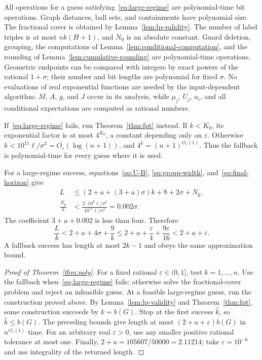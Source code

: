 \documentclass[11pt]{article}
\numberwithin{equation}{section}
\theoremstyle{definition}
\begin{document}
All operations for a guess satisfying~\eqref{eq:large-regime} are
polynomial-time bit operations. Graph distances, ball sets, and
containments have polynomial size. The fractional cover is obtained by
Lemma~\ref{lem:lp-validity}. The number of label triples is at most
$nk(H+1)$, and $N_0$ is an absolute constant.
Guard deletion, grouping, the computations of
Lemma~\ref{lem:conditional-computation}, and the rounding of
Lemma~\ref{lem:cumulative-rounding} are polynomial-time operations.
Geometric endpoints can be compared with integers by exact powers of
the rational $1+\sigma$; their number and bit lengths are polynomial
for fixed $\sigma$. No evaluations of real exponential functions are
needed by the input-dependent algorithm: $M$, $A$, $g$, and $J$ occur
in its analysis, while $\mu_j$, $U_j$, $a_i$, and all conditional
expectations are computed as rational numbers.

If~\eqref{eq:large-regime} fails, run Theorem~\ref{thm:fpt} instead.
If $k<K_0$, its exponential factor is at most $4^{K_0}$, a constant
depending only on $\varepsilon$. Otherwise
$k<10^{11}\ell/\sigma^3=O_\varepsilon(\log(n+1))$, and
$4^k=(n+1)^{O_\varepsilon(1)}$. Thus the fallback is polynomial-time
for every guess where it is used.

For a large-regime success, equations~\eqref{eq:U-B},
\eqref{eq:group-width}, and~\eqref{eq:final-horizon} give
\begin{align}
 L&\le(2+a+(3+a)\sigma)k+8+2\sigma+N_{\mathrm g},
       \label{eq:length-overhead}\\
 \frac{N_{\mathrm g}}k
 &<\frac{2\cdot10^8\ell/\sigma^2}
          {10^{11}\ell/\sigma^3}
   =0.002\sigma. \label{eq:guard-ratio}
\end{align}
The coefficient $3+a+0.002$ is less than four. Therefore
\[
 \frac Lk<2+a+4\sigma+\frac9k
       \le2+a+\frac{\varepsilon}{4}+\frac{9\varepsilon}{16}
       <2+a+\varepsilon.
\]
A fallback success has length at most $2k-1$ and obeys the same
approximation bound.

\begin{proof}[Proof of Theorem~\ref{thm:poly}]
For a fixed rational $\varepsilon\in(0,1]$, test $k=1,\ldots,n$.
Use the fallback when~\eqref{eq:large-regime} fails; otherwise solve
the fractional-cover problem and reject an infeasible guess. At a
feasible large-regime guess, run the construction proved above.
By Lemma~\ref{lem:lp-validity} and Theorem~\ref{thm:fpt}, some
construction succeeds by $k=b(G)$. Stop at the first success
$\widehat k$, so $\widehat k\le b(G)$.
The preceding bounds give length at most
$(2+a+\varepsilon)b(G)$ in $n^{O_\varepsilon(1)}$ time.
For an arbitrary real $\varepsilon>0$, use any smaller positive rational
tolerance at most one.
Finally, $2+a=105607/50000=2.11214$; take
$\varepsilon=10^{-6}$ and use integrality of the returned length.
\end{proof}
\end{document}
